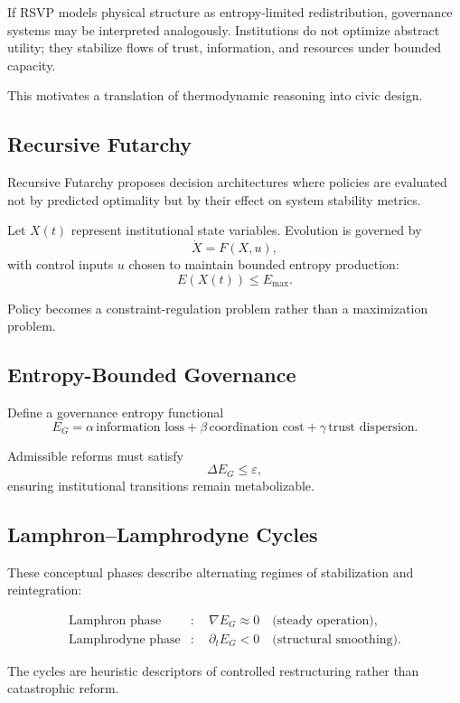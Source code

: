 \documentclass[12pt]{article}
\begin{document}
If RSVP models physical structure as entropy-limited redistribution, governance systems may be interpreted analogously. Institutions do not optimize abstract utility; they stabilize flows of trust, information, and resources under bounded capacity.

This motivates a translation of thermodynamic reasoning into civic design.

\subsection{Recursive Futarchy}

Recursive Futarchy proposes decision architectures where policies are evaluated not by predicted optimality but by their effect on system stability metrics.

Let $X(t)$ represent institutional state variables. Evolution is governed by
\[
\dot{X}=F(X,u),
\]
with control inputs $u$ chosen to maintain bounded entropy production:
\[
E(X(t))\le E_{\max}.
\]

Policy becomes a constraint-regulation problem rather than a maximization problem.

\subsection{Entropy-Bounded Governance}

Define a governance entropy functional
\[
E_G = \alpha\,\text{information loss}+\beta\,\text{coordination cost}+\gamma\,\text{trust dispersion}.
\]

Admissible reforms must satisfy
\[
\Delta E_G \le \varepsilon,
\]
ensuring institutional transitions remain metabolizable.

\subsection{Lamphron--Lamphrodyne Cycles}

These conceptual phases describe alternating regimes of stabilization and reintegration:

\begin{align}
\text{Lamphron phase} &:\quad \nabla E_G \approx 0 \quad \text{(steady operation)},\\
\text{Lamphrodyne phase} &:\quad \partial_t E_G<0 \quad \text{(structural smoothing)}.
\end{align}

The cycles are heuristic descriptors of controlled restructuring rather than catastrophic reform.
\end{document}
